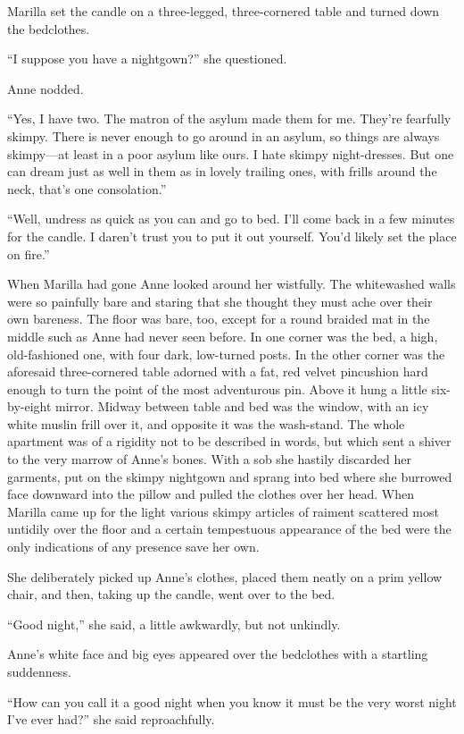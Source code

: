 \documentclass[a4paper]{article}
\begin{document}
Marilla set the candle on a three-legged, three-cornered table and turned down the bedclothes.

``I suppose you have a nightgown?'' she questioned.

Anne nodded.

``Yes, I have two. The matron of the asylum made them for me. They're fearfully skimpy. There is never enough to go around in an asylum, so things are always skimpy---at least in a poor asylum like ours. I hate skimpy night-dresses. But one can dream just as well in them as in lovely trailing ones, with frills around the neck, that's one consolation.''

``Well, undress as quick as you can and go to bed. I'll come back in a few minutes for the candle. I daren't trust you to put it out yourself. You'd likely set the place on fire.''

When Marilla had gone Anne looked around her wistfully. The whitewashed walls were so painfully bare and staring that she thought they must ache over their own bareness. The floor was bare, too, except for a round braided mat in the middle such as Anne had never seen before. In one corner was the bed, a high, old-fashioned one, with four dark, low-turned posts. In the other corner was the aforesaid three-cornered table adorned with a fat, red velvet pincushion hard enough to turn the point of the most adventurous pin. Above it hung a little six-by-eight mirror. Midway between table and bed was the window, with an icy white muslin frill over it, and opposite it was the wash-stand. The whole apartment was of a rigidity not to be described in words, but which sent a shiver to the very marrow of Anne's bones. With a sob she hastily discarded her garments, put on the skimpy nightgown and sprang into bed where she burrowed face downward into the pillow and pulled the clothes over her head. When Marilla came up for the light various skimpy articles of raiment scattered most untidily over the floor and a certain tempestuous appearance of the bed were the only indications of any presence save her own.


She deliberately picked up Anne's clothes, placed them neatly on a prim yellow chair, and then, taking up the candle, went over to the bed.

``Good night,'' she said, a little awkwardly, but not unkindly.

Anne's white face and big eyes appeared over the bedclothes with a startling suddenness.

``How can you call it a good night when you know it must be the very worst night I've ever had?'' she said reproachfully.
\end{document}
